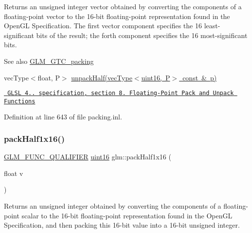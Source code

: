 Returns an unsigned integer vector obtained by converting the components of a floating-\/point vector to the 16-\/bit floating-\/point representation found in the Open\+GL Specification. The first vector component specifies the 16 least-\/significant bits of the result; the forth component specifies the 16 most-\/significant bits.

\begin{DoxySeeAlso}{See also}
\mbox{\hyperlink{group__gtc__packing}{G\+L\+M\+\_\+\+G\+T\+C\+\_\+packing}} 

vec\+Type$<$float, P$>$ \mbox{\hyperlink{group__gtc__packing_gaf3f9387834f8d8beadfe723c1dd247a7}{unpack\+Half(vec\+Type$<$uint16, P$>$ const \& p)}} 

\href{http://www.opengl.org/registry/doc/GLSLangSpec.4.20.8.pdf}{\texttt{ G\+L\+SL 4.. specification, section 8. Floating-\/\+Point Pack and Unpack Functions}} 
\end{DoxySeeAlso}


Definition at line 643 of file packing.\+inl.

\mbox{\label{group__gtc__packing_gaba534b320836a35372e00af5771dd1a2}} 
\subsubsection{\texorpdfstring{packHalf1x16()}{packHalf1x16()}}
{\footnotesize\ttfamily \mbox{\hyperlink{setup_8hpp_a33fdea6f91c5f834105f7415e2a64407}{G\+L\+M\+\_\+\+F\+U\+N\+C\+\_\+\+Q\+U\+A\+L\+I\+F\+I\+ER}} \mbox{\hyperlink{group__gtc__type__precision_gad8c2939e1fdd8e5828b31d95c52255d5}{uint16}} glm\+::pack\+Half1x16 (\begin{DoxyParamCaption}\item[{float}]{v }\end{DoxyParamCaption})}

Returns an unsigned integer obtained by converting the components of a floating-\/point scalar to the 16-\/bit floating-\/point representation found in the Open\+GL Specification, and then packing this 16-\/bit value into a 16-\/bit unsigned integer.

